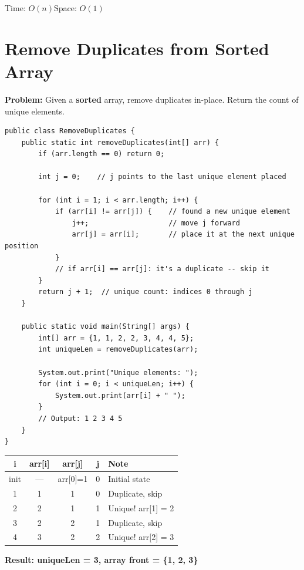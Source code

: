 \documentclass[12pt,a4paper,oneside]{book}
\begin{document}
\begin{complexity}
Time: $O(n)$\quad Space: $O(1)$
\end{complexity}

\section{Remove Duplicates from Sorted Array}

\textbf{Problem:} Given a \textbf{sorted} array, remove duplicates in-place. Return the count of unique elements.

\begin{lstlisting}[caption={Remove Duplicates from Sorted Array --- Two Pointer}]
public class RemoveDuplicates {
    public static int removeDuplicates(int[] arr) {
        if (arr.length == 0) return 0;

        int j = 0;    // j points to the last unique element placed

        for (int i = 1; i < arr.length; i++) {
            if (arr[i] != arr[j]) {    // found a new unique element
                j++;                   // move j forward
                arr[j] = arr[i];       // place it at the next unique position
            }
            // if arr[i] == arr[j]: it's a duplicate -- skip it
        }
        return j + 1;  // unique count: indices 0 through j
    }

    public static void main(String[] args) {
        int[] arr = {1, 1, 2, 2, 3, 4, 4, 5};
        int uniqueLen = removeDuplicates(arr);

        System.out.print("Unique elements: ");
        for (int i = 0; i < uniqueLen; i++) {
            System.out.print(arr[i] + " ");
        }
        // Output: 1 2 3 4 5
    }
}
\end{lstlisting}

\begin{dryrun}[Dry Run: arr = \{1, 1, 2, 2, 3\}]
\begin{center}
\begin{tabular}{ccccl}
\toprule
\textbf{i} & \textbf{arr[i]} & \textbf{arr[j]} & \textbf{j} & \textbf{Note}\\
\midrule
init & --- & arr[0]=1 & 0 & Initial state\\
1    & 1   & 1        & 0 & Duplicate, skip\\
2    & 2   & 1        & 1 & Unique! arr[1] = 2\\
3    & 2   & 2        & 1 & Duplicate, skip\\
4    & 3   & 2        & 2 & Unique! arr[2] = 3\\
\bottomrule
\end{tabular}
\end{center}
\textbf{Result: uniqueLen = 3, array front = \{1, 2, 3\}}
\end{dryrun}
\end{document}
